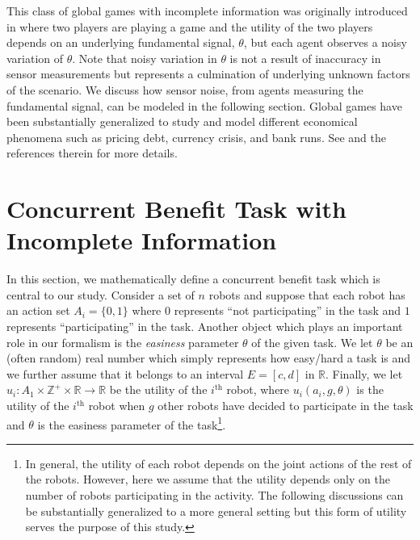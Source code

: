 \documentclass[conference]{ieeeconf}
\def\Z{\mathbb{Z}}
\def\R{\mathbb{R}}
\begin{document}
This class of global games with incomplete information was originally introduced in \cite{Carlsson1993} where two players are playing a game and the utility of the two players depends on an underlying fundamental signal, $\theta$, but each agent observes a noisy variation of $\theta$. Note that noisy variation in $\theta$ is not a result of inaccuracy in sensor measurements but represents a culmination of underlying unknown factors of the scenario. We discuss how sensor noise, from agents measuring the fundamental signal, can be modeled in the following section. Global games have been substantially generalized to study and model different economical phenomena such as pricing debt, currency crisis, and bank runs. See \cite{Morris2000} and the references therein for more details.



\section{Concurrent Benefit Task with Incomplete Information}
In this section, we mathematically define a concurrent benefit task which is central to our study. Consider a set of $n$ robots and suppose that each robot has an action set $A_i=\{0,1\}$ where $0$ represents ``not participating'' in the task and $1$ represents ``participating'' in the task.  Another object which plays an important role in our formalism is the \textit{easiness} parameter $\theta$ of the given task. We let $\theta$ be an (often random) real number which simply represents how easy/hard a task is and we further assume that it belongs to an interval $E=[c,d]$ in $\R$.  Finally, we let $u_i:A_1\times\Z^+\times \R\to \R$ be the utility of the $i^{\text{th}}$ robot, where $u_i(a_i,g,\theta)$ is the utility of the $i^{\text{th}}$ robot when $g$ other robots have decided to participate in the task and $\theta$ is the easiness parameter of the task\footnote{In general, the utility of each robot depends on the joint actions of the rest of the robots. However, here we assume that the utility depends only on the number of robots participating in the activity. The following discussions can be substantially generalized to a more general setting but this form of utility serves the purpose of this study.}. 
\end{document}
